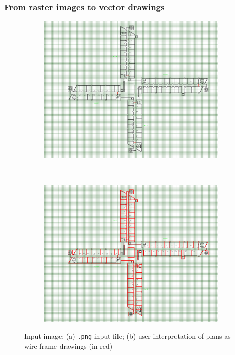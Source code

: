 \documentclass[]{egpubl}
\begin{document}
\subsubsection*{From raster images to vector drawings}

\begin{figure}[!h]
  \centering
  \begin{subfigure}[b]{0.485\linewidth}
  \includegraphics[width=\textwidth]{images/input-png}
  \caption{}
  \label{fig:input-png:a}
  \end{subfigure}
 ~
  \begin{subfigure}[b]{0.485\linewidth}
  \includegraphics[width=\textwidth]{images/input-png2}
  \caption{}
  \label{fig:input-png:b}
  \end{subfigure}
 
  \caption{Input image: (a) \texttt{.png} input file; (b) user-interpretation of plans as wire-frame drawings (in red)}
  \label{fig:input-png}
 \end{figure}
\end{document}

